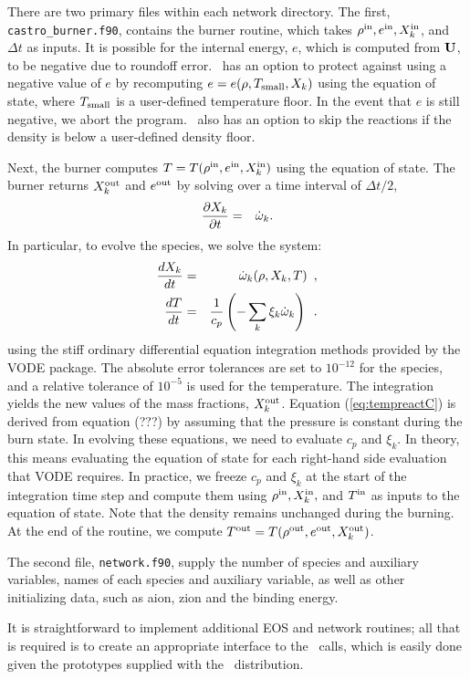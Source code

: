 There are two primary files within each network directory. The first,
{\tt castro\_burner.f90}, contains the burner routine, which takes
$\rho^{\rm in}, e^{\rm in}, X_k^{\rm in}$, and $\Delta t$ as inputs.  It is
possible for the internal energy, $e$, which is computed from ${\bf U}$,
to be negative due to roundoff error.  \castro\ has an option to protect
against using a negative value of $e$ by recomputing $e =
e(\rho,T_{\rm small},X_k)$ using the equation of state, where $T_{\rm
  small}$ is a user-defined temperature floor.  In the event that $e$
is still negative, we abort the program.  \castro\ also has an option to
skip the reactions if the density is below a user-defined density
floor.

Next, the burner computes $T = T(\rho^{\rm in},e^{\rm in},X_k^{\rm in})$ using the
equation of state.  The burner returns $X_k^{\rm out}$ and $e^{\rm out}$ by
solving over a time interval of $\Delta t/2$,
\begin{eqnarray}
\frac{\partial X_k}{\partial t} &=& \dot\omega_k.\\
\end{eqnarray}
In particular, to evolve the species, we solve the system:
\begin{eqnarray}
\frac{dX_k}{dt} &=& \dot\omega_k(\rho,X_k,T)\enskip, \label{eq:VODE1C} \\
\frac{dT}{dt} &=&\frac{1}{c_p} \left ( -\sum_k \xi_k  \dot\omega_k  \right )\enskip. \label{eq:tempreactC}
\end{eqnarray}
using the stiff ordinary differential equation integration methods
provided by the VODE package.  The absolute error tolerances are set
to $10^{-12}$ for the species, and a relative tolerance of $10^{-5}$
is used for the temperature.  The integration yields the new values of
the mass fractions, $X_k^{\rm out}$.  Equation (\ref{eq:tempreactC}) is
derived from equation (???) by assuming that the pressure is constant
during the burn state.  In evolving these equations, we need to
evaluate $c_p$ and $\xi_k$.  In theory, this means evaluating the
equation of state for each right-hand side evaluation that VODE
requires.  In practice, we freeze $c_p$ and $\xi_k$ at the start of
the integration time step and compute them using $\rho^{\rm in},
X_k^{\rm in},$ and $T^{\rm in}$ as inputs to the equation of state.  Note that
the density remains unchanged during the burning.  At the end of the
routine, we compute $T^{\rm out} = T(\rho^{\rm out},e^{{\rm out}},X_k^{\rm out})$.

The second file, {\tt network.f90}, supply the number of species and
auxiliary variables, names of each species and auxiliary variable, as
well as other initializing data, such as aion, zion and the binding
energy.

It is straightforward to implement additional EOS and network
routines; all that is required is to create an appropriate interface
to the \castro\ calls, which is easily done given the prototypes
supplied with the \castro\ distribution.

